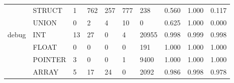 \begin{table}
\begin{tabular}{lp{1.33cm}p{1.33cm}p{1.33cm}p{1.33cm}p{1.33cm}p{1.33cm}p{1.33cm}p{1.33cm}p{1.33cm}}
      & STRUCT &                                                  1 &                                              762 &                                             257 &                                              777 &                                            238 &                                    0.560 &                                              1.000 &                                              0.117 \\
      & UNION &                                                  0 &                                                2 &                                               4 &                                               10 &                                              0 &                                    0.625 &                                              1.000 &                                              0.000 \\
\cline{1-10}
\multirow{6}{*}{debug} & INT &                                                 13 &                                               27 &                                               0 &                                                4 &                                          20955 &                                    0.998 &                                              0.999 &                                              0.998 \\
      & FLOAT &                                                  0 &                                                0 &                                               0 &                                                0 &                                            191 &                                    1.000 &                                              1.000 &                                              1.000 \\
      & POINTER &                                                  3 &                                                0 &                                               0 &                                                1 &                                           9400 &                                    1.000 &                                              1.000 &                                              1.000 \\
      & ARRAY &                                                  5 &                                               17 &                                              24 &                                                0 &                                           2092 &                                    0.986 &                                              0.998 &                                              0.978 \\

\end{tabular}
\end{table}
